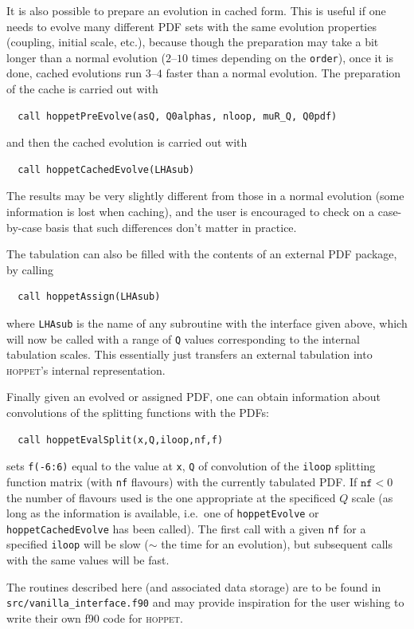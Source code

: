 \documentclass[12pt]{article}
\newcommand{\ie}{i.e.\ }
\newcommand{\hoppet}{\textsc{hoppet}\xspace}
\newcommand{\ttt}[1]{\texttt{#1}}
\begin{document}
It is also possible to prepare an evolution in cached form. This is
useful if one needs to evolve many different PDF sets with the same
evolution properties (coupling, initial scale, etc.), because though
the preparation may take a bit longer than a normal evolution
($2$--$10$ times depending on the \ttt{order}), once it is done,
cached evolutions run $3$--$4$ faster than a normal evolution. The
preparation of the cache is carried out with
\begin{verbatim}
  call hoppetPreEvolve(asQ, Q0alphas, nloop, muR_Q, Q0pdf)
\end{verbatim}
and then the cached evolution is carried out with 
\begin{verbatim}
  call hoppetCachedEvolve(LHAsub)
\end{verbatim}
The results may be very slightly different from those in a normal
evolution (some information is lost when caching), and the user is
encouraged to check on a case-by-case basis that such differences
don't matter in practice.

The tabulation can also be filled with the contents of an external PDF
package, by calling
\begin{verbatim}
  call hoppetAssign(LHAsub)
\end{verbatim}
where \ttt{LHAsub} is the name of any subroutine with the interface
given above, which will now be called with a range of \ttt{Q} values
corresponding to the internal tabulation scales. This essentially just
transfers an external tabulation into \hoppet's internal
representation. 

Finally given an evolved or assigned PDF, one can obtain information
about convolutions of the splitting functions with the PDFs:
\begin{verbatim}
  call hoppetEvalSplit(x,Q,iloop,nf,f)
\end{verbatim}
sets \ttt{f(-6:6)} equal to the value at \ttt{x}, \ttt{Q} of
convolution of the \ttt{iloop} splitting function matrix (with
\ttt{nf} flavours) with the currently tabulated PDF. If $\ttt{nf}<0$
the number of flavours used is the one appropriate at the specificed
$Q$ scale (as long as the information is available, \ie one of
\ttt{hoppetEvolve} or \ttt{hoppetCachedEvolve} has been called). The
first call with a given \ttt{nf} for a specified \ttt{iloop} will be
slow ($\sim$ the time for an evolution), but subsequent calls with the
same values will be fast. 

The routines described here (and associated data storage) are to be
found in \ttt{src/vanilla\_interface.f90} and may provide inspiration
for the user wishing to write their own f90 code for \hoppet.
\end{document}
